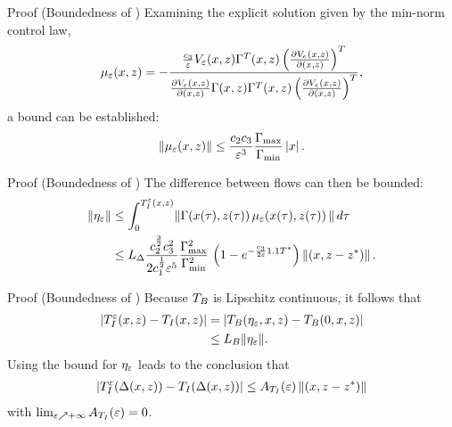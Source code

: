 \begin{frame}[t]
   {
    \begin{block}{Proof (Boundedness of \TtI{})}
      Examining the explicit solution given by the min-norm control law,
      \begin{align*}
        \mu_{\varepsilon}(x, z) = - \frac{\frac{c_{3}}{\varepsilon} V_{\varepsilon}(x, z)
          \Gamma^{T}(x, z) \left( \frac{\partial{V_{e}(x, z)}}{\partial{(x, z)}}
          \right)^{T}}{\frac{\partial{V_{e}(x, z)}}{\partial{(x, z)}} \Gamma(x, z) \Gamma^{T}(x, z)
          \left( \frac{\partial{V_{e}(x, z)}}{\partial{(x, z)}} \right)^{T}},
      \end{align*}
      a bound can be established:
      \begin{align*}
        \| \mu_{\varepsilon}(x, z) \| \leq \frac{c_{2}c_{3}}{\varepsilon^{3}} \frac{\Gamma_{\max}}{\Gamma_{\min}} \left|x\right|.
      \end{align*}
    \end{block}
  }

   {
    \begin{block}{Proof (Boundedness of \TtI{})}
      The difference between flows can then be bounded:
      \begin{align*}
        \|\eta_{\varepsilon}\| &\leq \int_{0}^{T_{I}^{\varepsilon}(x, z)} \! \left\| \Gamma(x(\tau), z(\tau)) \,
          \mu_{\varepsilon}(x(\tau), z(\tau)) \, \right\| d\tau\\
        &\leq L_{\Delta} \frac{c_{2}^{\frac{3}{2}}
          c_{3}^{2}}{2c_{1}^{\frac{1}{2}}\varepsilon^{5}}
        \frac{\Gamma_{\max}^{2}}{\Gamma_{\min}^{2}}  \, \left(1 -
          e^{-\frac{c_{3}}{2\varepsilon} 1.1 T^{*}}\right) \left\|(x, z - z^{*})\right\|.
      \end{align*}
    \end{block}
  }
  
   {
    \begin{block}{Proof (Boundedness of \TtI{})}
      Because $T_{B}$ is Lipschitz continuous, it follows that
      \begin{align*}
        | T_{I}^{\varepsilon}(x, z) - T_{I}(x, z) | &= | T_{B}(\eta_{\varepsilon}, x, z) - T_{B}(0,
        x, z)|\\
        &\leq L_{B} \| \eta_{\varepsilon} \|.
      \end{align*}
      Using the bound for $\eta_{\varepsilon}$ leads to the conclusion that
      \begin{align*}
        | T_{I}^{\varepsilon}(\Delta(x, z)) - T_{I}(\Delta(x, z)) | \leq A_{T_{I}}(\varepsilon) \left\|(x, z - z^{*})\right\|
      \end{align*}
      with $\lim_{\varepsilon \nearrow +\infty} A_{T_{I}}(\varepsilon) = 0$. \hfill \qedsymbol
    \end{block}
  }
\end{frame}

